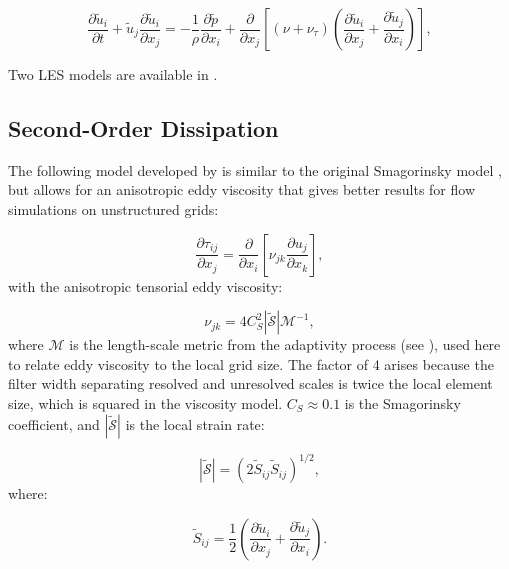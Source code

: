 \begin{equation}
\frac{\partial \tilde u_i}{\partial t} + \tilde u_j \frac{\partial \tilde u_i}{\partial x_j}
 = -\frac 1 \rho \frac{\partial \tilde p}{\partial x_i}
 + \frac{\partial}{\partial x_j} \left [ (\nu + \nu_\tau) \left ( \frac{\partial \tilde u_i}{\partial x_j} + \frac{\partial \tilde u_j}{\partial x_i} \right ) \right ],
\end{equation}

Two LES models are available in \fluidity.

\subsection{Second-Order Dissipation}

The following model developed by \citet{bentham2003} is similar to the original Smagorinsky model \citep{smagorinsky1963general}, but allows for an anisotropic eddy viscosity that gives better results for flow simulations on unstructured grids:

\begin{equation}\label{smag}
\frac{\partial \tau_{ij}}{\partial x_j} = \frac{\partial}{\partial x_i} \left [ \nu_{jk}\frac{\partial u_j}{\partial x_k} \right ],
\end{equation}
with the anisotropic tensorial eddy viscosity:

\begin{equation}
\nu_{jk} = 4C_S^2 \left | \mathcal{\tilde S} \right | \mathcal{M}^{-1},
\end{equation}
where $\mathcal{M}$ is the length-scale metric from the adaptivity process (see \citet{pain2001}), used here to relate eddy viscosity to the local grid size. The factor of 4 arises because the filter width separating resolved and unresolved scales is twice the local element size, which is squared in the viscosity model. $C_S \approx 0.1$ is the Smagorinsky coefficient, and $\left | \mathcal{\tilde S} \right |$ is the local strain rate:

\begin{equation}
\left | \mathcal{\tilde S} \right | = (2 \tilde S_{ij} \tilde S_{ij})^{1/2},
\end{equation}
where:

\begin{equation}\label{strainrate}
\tilde S_{ij} = \frac 1 2 \left ( \frac{\partial \tilde u_i}{\partial x_j} + \frac{\partial \tilde u_j}{\partial x_i} \right ).
\end{equation}

